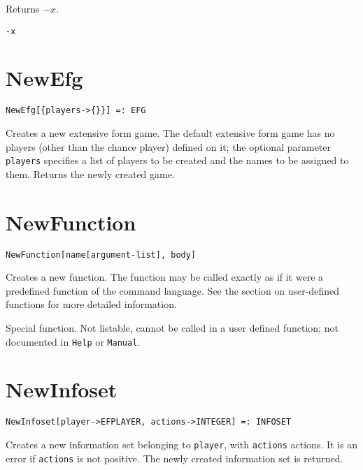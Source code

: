 \noindent
Returns $-x$.

\shortform \verb+-x+


\section*{NewEfg}\label{PrimNewEfg}
\begin{verbatim} 
NewEfg[{players->{}}] =: EFG 
\end{verbatim}

\noindent
Creates a new extensive form game.  The default extensive form
game has no players (other than the chance player) defined on it; the
optional parameter \verb+players+ specifies a list of players to be
created and the names to be assigned to them.  Returns the newly created game.


\section*{NewFunction}\label{PrimNewFunction}
\begin{verbatim}
NewFunction[name[argument-list], body]
\end{verbatim}

\noindent
Creates a new function.  The function may be called exactly
as if it were a predefined function of the command language.  See the
section on user-defined functions for more detailed information.

\note Special function.  Not listable, cannot be called in a
user defined function; not documented in \verb+Help+ or \verb+Manual+.  



\section*{NewInfoset}\label{PrimNewInfoset}
\begin{verbatim} 
NewInfoset[player->EFPLAYER, actions->INTEGER] =: INFOSET 
\end{verbatim}

\noindent
Creates a new information set belonging to \verb+player+, with
\verb+actions+ actions.  It is an error if \verb+actions+ is not
positive.  The newly created information set is returned.

